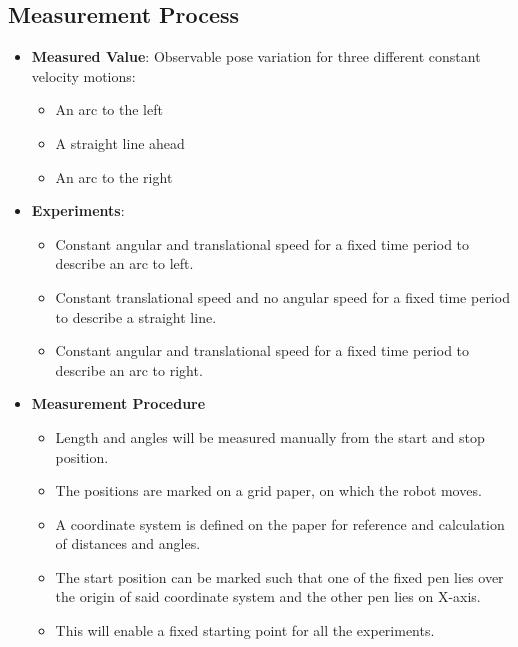 \documentclass[10pt,a4paper]{article}
\begin{document}
	\subsection{Measurement Process}
		\begin{itemize}
			\item \textbf{Measured Value}: Observable pose variation for three different constant velocity motions: 
				\begin{itemize}
					\item An arc to the left
					\item A straight line ahead
					\item An arc to the right
				\end{itemize}
			 \item \textbf{Experiments}: 
				 \begin{itemize}
				 	\item Constant angular and translational speed for a fixed time period to describe an arc to left.
				 	\item Constant translational speed and no angular speed for a fixed time period to describe a straight line.
				 	\item Constant angular and translational speed for a fixed time period to describe an arc to right.
				 \end{itemize}
			\item \textbf{Measurement Procedure} 
				\begin{itemize}
					\item Length and angles will be measured manually from the start and stop position.
					\item The positions are marked on a grid paper, on which the robot moves.
					\item A coordinate system is defined on the paper for reference and calculation of distances and angles.
					\item The start position can be marked such that one of the fixed pen lies over the origin of said coordinate system and the other pen lies on X-axis. 
					\item This will enable a fixed starting point for all the experiments.
				\end{itemize}
			 
		\end{itemize}
\end{document}
